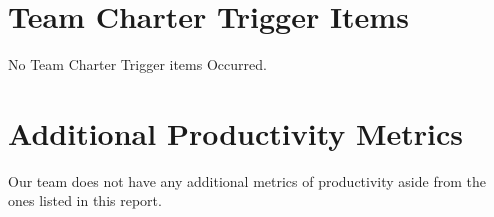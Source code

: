\documentclass{article}
\begin{document}

\section{Team Charter Trigger Items}

No Team Charter Trigger items Occurred.


\section{Additional Productivity Metrics}

Our team does not have any additional metrics of
productivity aside from the ones listed in this report.
\end{document}
